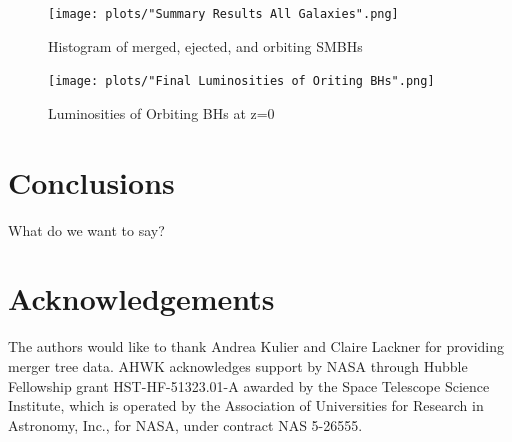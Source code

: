 \documentclass[english, apj]{emulateapj}
\begin{document}
\begin{figure}[ht]
\begin{center}
\texttt{[image: plots/"Summary Results All Galaxies".png]}
\caption{Histogram of merged, ejected, and orbiting SMBHs}
\label{fig:meosmbh}
\end{center}
\end{figure}

\begin{figure}[ht]
\begin{center}
\texttt{[image: plots/"Final Luminosities of Oriting BHs".png]}
\caption{Luminosities of Orbiting BHs at z=0}
\label{fig:loobhs}
\end{center}
\end{figure}

\section{Conclusions}\label{sec:conclusions}
What do we want to say?



\section*{Acknowledgements}

The authors would like to thank Andrea Kulier and Claire Lackner for providing merger tree data. AHWK acknowledges support by NASA through Hubble Fellowship grant HST-HF-51323.01-A awarded by the Space Telescope Science Institute, which is operated by the Association of Universities for Research in Astronomy, Inc., for NASA, under contract NAS 5-26555. 








\end{document}
